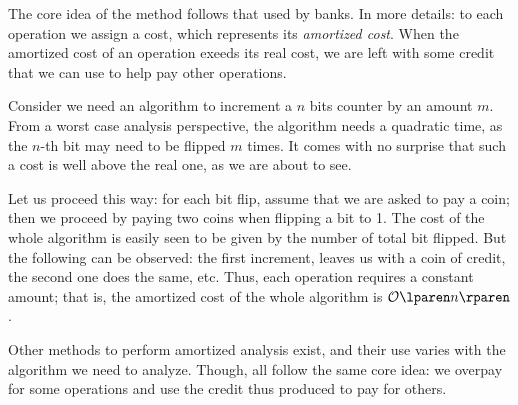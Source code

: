\documentclass{subfiles}
\begin{document}
    The core idea of the method follows that used by banks.
        In more details: to each operation we assign a cost,
        which represents its \emph{amortized cost}.
        When the amortized cost of an operation exeeds its real cost, 
        we are left with some credit that we can use to help pay other operations.

    \begin{example*}
        Consider we need an algorithm to increment a \(n\) bits counter by 
            an amount \(m\). From a worst case analysis perspective,
            the algorithm needs a quadratic time, as the \(n\)-th bit may need to be flipped \(m\) times.
            It comes with no surprise that such a cost is well above the real one,
            as we are about to see.

        Let us proceed this way: for each bit flip, assume that we are asked to pay 
            a coin; then we proceed by paying two coins when flipping a bit to 1.
            The cost of the whole algorithm is easily seen to be given by the number of 
            total bit flipped. But the following can be observed: the first increment,
            leaves us with a coin of credit, the second one does the same,
            etc. Thus, each operation requires a constant amount;
            that is, the amortized cost of the whole algorithm is \(\ofO{n}\).            
    \end{example*}

    \begin{remark*}
        Other methods to perform amortized analysis exist, 
            and their use varies with the algorithm we need to analyze.
            Though, all follow the same core idea: we overpay for some operations
            and use the credit thus produced to pay for others.
    \end{remark*}
\end{document}
